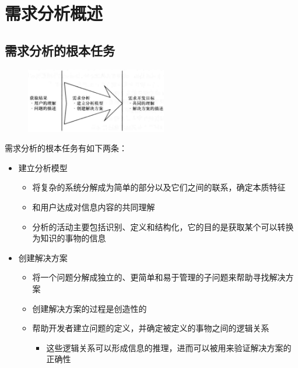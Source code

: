 \section{需求分析概述}

\subsection{需求分析的根本任务}

\begin{figure}[H]
	\centering
    \vspace{-1em}
	\includegraphics[width=0.55\textwidth]{img/需求分析的任务.png}
    \vspace{-1em}
\end{figure}

需求分析的根本任务有如下两条：
\begin{itemize}
    \item 建立分析模型
    \begin{itemize}
        \item 将复杂的系统分解成为简单的部分以及它们之间的联系，确定本质特征
        \item 和用户达成对信息内容的共同理解
        \item 分析的活动主要包括识别、定义和结构化，它的目的是获取某个可以转换为知识的事物的信息
    \end{itemize}
    \item 创建解决方案
    \begin{itemize}
        \item 将一个问题分解成独立的、更简单和易于管理的子问题来帮助寻找解决方案
        \item 创建解决方案的过程是创造性的
        \item 帮助开发者建立问题的定义，并确定被定义的事物之间的逻辑关系
        \begin{itemize}
            \item 这些逻辑关系可以形成信息的推理，进而可以被用来验证解决方案的正确性
        \end{itemize}
    \end{itemize}
\end{itemize}

